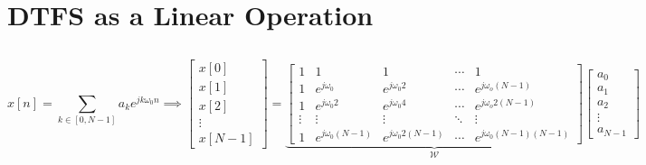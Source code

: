 \documentclass{article}
\begin{document}
\section{DTFS as a Linear Operation}

\subsection{}

\begin{equation}
    x[n] = \sum_{k \in [0, N - 1]} a_k e^{j k \omega_0 n} \implies
    \begin{bmatrix}
        x[0] \\
        x[1] \\
        x[2] \\
        \vdots \\
        x[N - 1]
    \end{bmatrix}
    =
    \underbrace{\begin{bmatrix}
        1 & 1 & 1 & \cdots & 1 \\
        1 & e^{j \omega_0} & e^{j \omega_0 2} & \cdots & e^{j \omega_o (N - 1)} \\
        1 & e^{j \omega_0 2} & e^{j \omega_0 4} & \cdots & e^{j \omega_o 2(N - 1)} \\
        \vdots & \vdots & \vdots & \ddots & \vdots \\
        1 & e^{j \omega_0 (N - 1)} & e^{j \omega_0 2(N - 1)} & \cdots & e^{j \omega_0 (N - 1) (N - 1)}
    \end{bmatrix}}_{\mathcal{W}}
    \begin{bmatrix}
        a_0 \\
        a_1 \\
        a_2 \\
        \vdots \\
        a_{N - 1}    
    \end{bmatrix}
\end{equation}

\subsection{}
\end{document}
